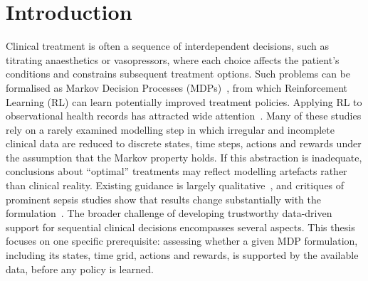 \documentclass[runningheads]{llncs}
\begin{document}
\section{Introduction}
Clinical treatment is often a sequence of interdependent decisions, such as titrating anaesthetics or vasopressors, where each choice affects the patient’s conditions and constrains subsequent treatment options. Such problems can be formalised as Markov Decision Processes (MDPs)~\cite{Puterman1994}, from which Reinforcement Learning (RL) can learn potentially improved treatment policies. Applying RL to observational health records has attracted wide attention~\cite{Komorowski2018}. Many of these studies rely on a rarely examined modelling step in which irregular and incomplete clinical data are reduced to discrete states, time steps, actions and rewards under the assumption that the Markov property holds. If this abstraction is inadequate, conclusions about ``optimal'' treatments may reflect modelling artefacts rather than clinical reality. Existing guidance is largely qualitative~\cite{Gottesman2019}, and critiques of prominent sepsis studies show that results change substantially with the formulation~\cite{Jeter2019,Luo2024}. The broader challenge of developing trustworthy data-driven support for sequential clinical decisions encompasses several aspects. This thesis focuses on one specific prerequisite: assessing whether a given MDP formulation, including its states, time grid, actions and rewards, is supported by the available data, before any policy is learned.
\end{document}
